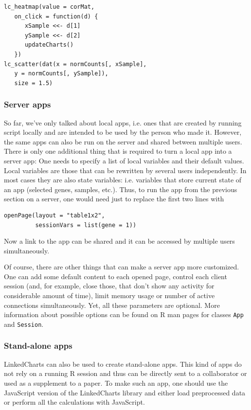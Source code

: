 \documentclass[twocolumn,10pt]{article}
\begin{document}
\begin{verbatim}
lc_heatmap(value = corMat,
   on_click = function(d) {
      xSample <<- d[1]
      ySample <<- d[2]
      updateCharts()
   })
lc_scatter(dat(x = normCounts[, xSample], 
   y = normCounts[, ySample]),
   size = 1.5)
\end{verbatim}

\subsubsection{Server apps}

So far, we've only talked about local apps, i.e. ones that are created by running script locally and are intended to be used by the person who made it. However, the same apps can also be run on the server and shared between multiple users. There is only one additional thing that is required to turn a local app into a server app: One needs to specify a list of local variables and their default values. Local variables are those that can be rewritten by several users independently. In most cases they are also state variables: i.e. variables that store current state of an app (selected genes, samples, etc.). Thus, to run the app from the previous section on a server, one would need just to replace the first two lines with

\begin{verbatim}
openPage(layout = "table1x2", 
         sessionVars = list(gene = 1))
\end{verbatim}

Now a link to the app can be shared and it can be accessed by multiple users simultaneously.

Of course, there are other things that can make a server app more customized. One can add some default content to each opened page, control each client session (and, for example, close those, that don't show any activity for considerable amount of time), limit memory usage or number of active connections simultaneously. Yet, all these parameters are optional. More information about possible options can be found on R man pages for classes \texttt{App} and \texttt{Session}.

\subsubsection{Stand-alone apps}

LinkedCharts can also be used to create stand-alone apps. This kind of apps do not rely on a running R session and thus can be directly sent to a collaborator or used as a supplement to a paper. To make such an app, one should use the JavaScript version of the LinkedCharts library and either load preprocessed data or perform all the calculations with JavaScript. 
\end{document}
